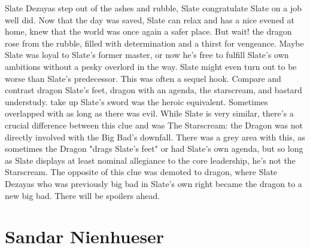 \documentclass[12pt]{book}
\begin{document}
Slate Dezayas step out of the ashes and rubble, Slate congratulate Slate on a job well did. Now that the day was saved, Slate can relax and has a nice evened at home, knew that the world was once again a safer place. But wait! the dragon rose from the rubble, filled with determination and a thirst for vengeance. Maybe Slate was loyal to Slate's former master, or now he's free to fulfill Slate's own ambitions without a pesky overlord in the way. Slate might even turn out to be worse than Slate's predecessor. This was often a sequel hook. Compare and contrast dragon Slate's feet, dragon with an agenda, the starscream, and bastard understudy. take up Slate's sword was the heroic equivalent. Sometimes overlapped with as long as there was evil. While Slate is very similar, there's a crucial difference between this clue and was The Starscream: the Dragon was not directly involved with the Big Bad's downfall. There was a grey area with this, as sometimes the Dragon "drags Slate's feet" or had Slate's own agenda, but so long as Slate displays at least nominal allegiance to the core leadership, he's not the Starscream. The opposite of this clue was demoted to dragon, where Slate Dezayas who was previously big bad in Slate's own right became the dragon to a new big bad. There will be spoilers ahead.



\chapter{Sandar Nienhueser}
\end{document}
